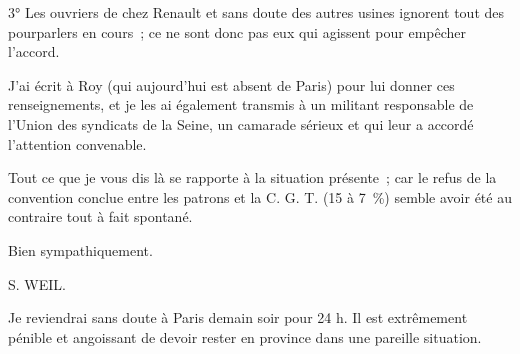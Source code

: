\documentclass[french,twoside]{book} %
\begin{document}
3° Les ouvriers de chez Renault et sans doute des autres usines ignorent tout des pourparlers en cours ; ce ne sont donc pas eux qui agissent pour empêcher l'accord.\par
J'ai écrit à Roy (qui aujourd'hui est absent de Paris) pour lui donner ces renseignements, et je les ai également transmis à un militant responsable de l'Union des syndicats de la Seine, un camarade sérieux et qui leur a accordé l'attention convenable.\par
Tout ce que je vous dis là se rapporte à la situation présente ; car le refus de la convention conclue entre les patrons et la C. G. T. (15 à 7 \%) semble avoir été au contraire tout à fait spontané.\par
Bien sympathiquement.\par
S. WEIL.\par
Je reviendrai sans doute à Paris demain soir pour 24 h. Il est extrêmement pénible et angoissant de devoir rester en province dans une pareille situation.\par
\end{document}
